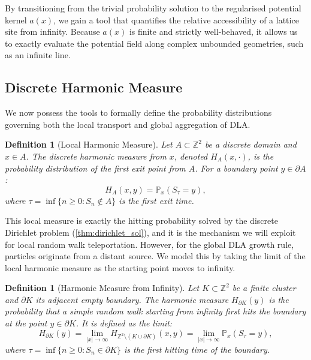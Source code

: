 \documentclass[12pt, a4paper, oneside]{report}
\newtheorem{definition}[theorem]{Definition}
\theoremstyle{remark}
\begin{document}
By transitioning from the trivial probability solution to the regularised potential kernel $a(x)$, we gain a tool that quantifies the relative accessibility of a lattice site from infinity. Because $a(x)$ is finite and strictly well-behaved, it allows us to exactly evaluate the potential field along complex unbounded geometries, such as an infinite line.

\subsection{Discrete Harmonic Measure}
\label{sec:harmonic_measure}

We now possess the tools to formally define the probability distributions governing both the local transport and global aggregation of DLA. 

\begin{definition}[Local Harmonic Measure]
Let $A \subset \mathbb{Z}^2$ be a discrete domain and $x \in A$. The discrete harmonic measure from $x$, denoted $H_A(x, \cdot)$, is the probability distribution of the first exit point from $A$. For a boundary point $y \in \partial A$:
\begin{equation*}
    H_A(x, y) = \mathbb{P}_x(S_\tau = y),
\end{equation*}
where $\tau = \inf\{n \ge 0 : S_n \notin A\}$ is the first exit time.
\end{definition}

This local measure is exactly the hitting probability solved by the discrete Dirichlet problem (\cref{thm:dirichlet_sol}), and it is the mechanism we will exploit for local random walk teleportation. However, for the global DLA growth rule, particles originate from a distant source. We model this by taking the limit of the local harmonic measure as the starting point moves to infinity.

\begin{definition}[Harmonic Measure from Infinity]
Let $K \subset \mathbb{Z}^2$ be a finite cluster and $\partial K$ its adjacent empty boundary. The harmonic measure $H_{\partial K}(y)$ is the probability that a simple random walk starting from infinity first hits the boundary at the point $y \in \partial K$. It is defined as the limit:
\begin{equation*}
    H_{\partial K}(y) = \lim_{|x| \to \infty} H_{\mathbb{Z}^2 \setminus (K \cup \partial K)}(x, y) = \lim_{|x| \to \infty} \mathbb{P}_x(S_{\tau} = y),
\end{equation*}
where $\tau = \inf\{n \ge 0 : S_n \in \partial K\}$ is the first hitting time of the boundary.
\end{definition}
\end{document}
